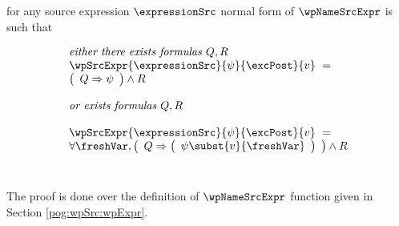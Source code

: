 \begin{wpExprSrc} \label{pogEq:aux:wpExprSrc}
for any source expression $\expressionSrc$ 
normal form of  $\wpNameSrcExpr$ is such that 

$$ \begin{array}{l}
         \mbox{\rm\textit{either  there exists formulas $ Q,R$  }} \\
         \wpSrcExpr{\expressionSrc }{ \psi }{ \excPost}{v} \  = \\ 
         \left( \begin{array}{l} Q \Rightarrow \psi   \end{array} \right)
          \wedge 
	  R \\\\
	  \mbox{\rm\textit{or exists formulas $ Q,R $   }} \\
\\
 \wpSrcExpr{\expressionSrc }{ \psi }{ \excPost}{v} \  = \\
      \forall \freshVar, %
                 \left( \begin{array}{l} Q \Rightarrow \left( \begin{array}{l} \psi \subst{v}{ \freshVar}\end{array} \right)  \end{array} \right)    \wedge   R  
									            
                                                                        
   \end{array}  $$ \\
\end{wpExprSrc}

The proof is done over the  definition of $\wpNameSrcExpr$ function given in Section \ref{pog:wpSrc:wpExpr}.



